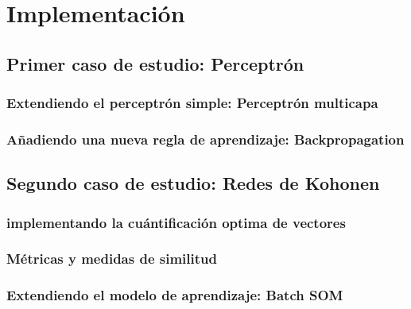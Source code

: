 \chapter{Implementación}
\label{cha:Implemetación}


\section{Primer caso de estudio: Perceptrón}



\subsection{Extendiendo el perceptrón simple: Perceptrón multicapa}



\subsection{Añadiendo una nueva regla de aprendizaje: Backpropagation}



\section{Segundo caso de estudio: Redes de Kohonen}


\subsection{implementando la cuántificación optima de vectores}



\subsection{Métricas y medidas de similitud}



\subsection{Extendiendo el modelo de aprendizaje: Batch SOM}
